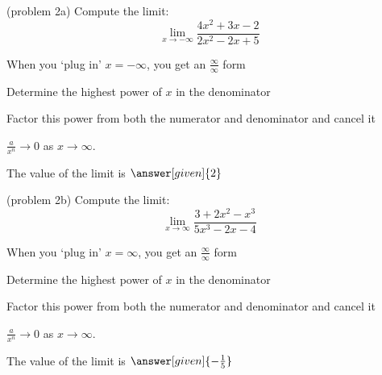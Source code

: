 \documentclass{ximera}
\begin{document}
\begin{problem}(problem 2a)
  Compute the limit:
  \[
  \lim_{x \to -\infty} \frac{4x^2 + 3x - 2}{2x^2 - 2x + 5}
  \]
  
    \begin{hint}
      When you `plug in' $x = -\infty$, you get an $\frac{\infty}{\infty}$ form
    \end{hint}
    \begin{hint}
      Determine the highest power of $x$ in the denominator
    \end{hint}
    \begin{hint}
      Factor this power from both the numerator and denominator and cancel it
    \end{hint}
    \begin{hint}
      $\frac{a}{x^n} \to 0$ as $x \to \infty$.
    \end{hint}
		The value of the limit is
		 $\answer[given]{2}$
		
\end{problem}



\begin{problem}(problem 2b)
  Compute the limit:
  \[
  \lim_{x \to \infty} \frac{3 + 2x^2 - x^3}{5x^3 - 2x -4}
  \]
  
    \begin{hint}
      When you `plug in' $x = \infty$, you get an $\frac{\infty}{\infty}$ form
    \end{hint}
    \begin{hint}
      Determine the highest power of $x$ in the denominator
    \end{hint}
    \begin{hint}
      Factor this power from both the numerator and denominator and cancel it
    \end{hint}
    \begin{hint}
      $\frac{a}{x^n} \to 0$ as $x \to \infty$.
    \end{hint}
		The value of the limit is
		 $\answer[given]{-\frac15}$
		
\end{problem}
\end{document}
